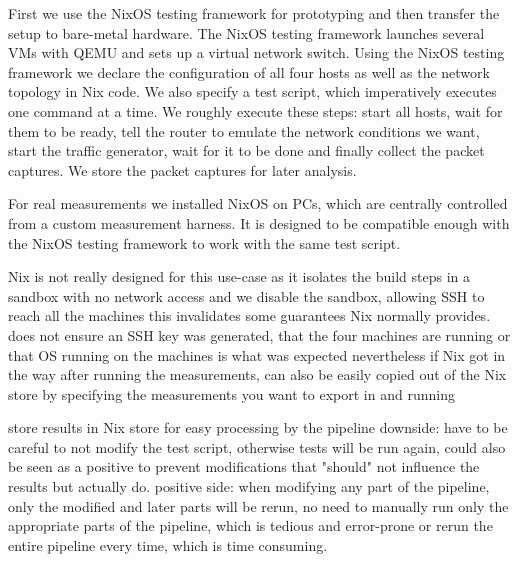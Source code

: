 First we use the NixOS testing framework for prototyping and then transfer the setup to bare-metal hardware.
The NixOS testing framework launches several VMs with QEMU and sets up a virtual network switch.
Using the NixOS testing framework we declare the configuration of all four hosts as well as the network topology in Nix code.
We also specify a test script, which imperatively executes one command at a time.
We roughly execute these steps: start all hosts, wait for them to be ready, tell the router to emulate the network conditions we want, start the traffic generator, wait for it to be done and finally collect the packet captures.
We store the packet captures for later analysis.


For real measurements we installed NixOS on PCs, which are centrally controlled from a custom measurement harness.
It is designed to be compatible enough with the NixOS testing framework to work with the same test script.



Nix is not really designed for this use-case as it isolates the build steps in a sandbox with no network access and 
we disable the sandbox, allowing SSH to reach all the machines
this invalidates some guarantees Nix normally provides.
does not ensure an SSH key was generated, that the four machines are running or that OS running on the machines is what was expected
nevertheless
if Nix got in the way after running the measurements, can also be easily copied out of the Nix store by specifying the measurements you want to export in  and running 

store results in Nix store for easy processing by the pipeline
downside: have to be careful to not modify the test script, otherwise tests will be run again, could also be seen as a positive to prevent modifications that "should" not influence the results but actually do.
positive side: when modifying any part of the pipeline, only the modified and later parts will be rerun, no need to manually run only the appropriate parts of the pipeline, which is tedious and error-prone or rerun the entire pipeline every time, which is time consuming.


